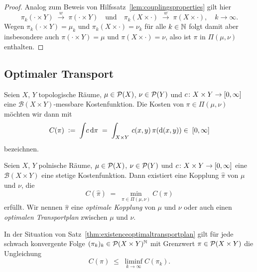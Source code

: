 \documentclass[../main/main.tex]{subfiles}
\begin{document}
	\begin{proof}
		Analog zum Beweis von Hilfssatz~\ref{lem:couplingsproperties} gilt hier
		\[ \pi_k(\cdot \times Y) \; \xrightarrow{w} \; \pi(\cdot \times Y) \quad \text{und} \quad \pi_k(X \times \cdot) \; \xrightarrow{w} \; \pi(X \times \cdot), \quad k \to \infty \text{.} \]
		Wegen $\pi_k(\cdot \times Y) = \mu_k$ und $\pi_k(X \times \cdot) = \nu_k$ für alle $k \in \mathbb{N}$ folgt damit aber insbesondere auch $\pi(\cdot \times Y) = \mu$ und $\pi(X \times \cdot) = \nu$, also
		ist $\pi$ in $\Pi(\mu, \nu)$ enthalten.
	\end{proof}

	\subsection{Optimaler Transport}

	\begin{Definition}
		Seien $X$, $Y$ topologische Räume, $\mu \in \mathcal{P}(X)$, $\nu \in \mathcal{P}(Y)$ und $c \colon X \times Y \to [0, \infty]$ eine $\mathcal{B}(X \times Y)$-messbare Kostenfunktion.
		Die Kosten von $\pi \in \Pi(\mu, \nu)$ möchten wir dann mit
		\[ C(\pi) \; \vcentcolon = \; \int_{} \, c \, \mathrm{d}\pi \; = \; \int_{X \times Y} \, c(x, y) \, \pi(\mathrm{d}(x, y)) \in \; [0, \infty] \]
		bezeichnen.
	\end{Definition}

	\begin{Satz}
		\label{thm:existenceoptimaltransportplan}
		Seien $X$, $Y$ polnische Räume, $\mu \in \mathcal{P}(X)$, $\nu \in \mathcal{P}(Y)$ und $c \colon X \times Y \to [0, \infty]$ eine $\mathcal{B}(X \times Y)$ eine stetige 
		Kostenfunktion. Dann existiert eine Kopplung $\hat{\pi}$ von $\mu$ und $\nu$, die 
		\[ C(\hat{\pi}) \; = \; \min_{\pi \in \Pi(\mu, \nu)} C(\pi) \]
		erfüllt. Wir nennen $\hat{\pi}$ eine \emph{optimale Kopplung} von $\mu$ und $\nu$ oder auch einen \emph{optimalen Transportplan} zwischen $\mu$ und $\nu$.
	\end{Satz}

	\begin{Hilfssatz}
		\label{lem:lsccost}
		In der Situation von Satz~\ref{thm:existenceoptimaltransportplan} gilt für jede schwach konvergente Folge $(\pi_k)_k \in \mathcal{P}(X \times Y)^{\mathbb{N}}$ mit Grenzwert $\pi \in \mathcal{P}(X \times Y)$ die Ungleichung
		\[ C(\pi) \; \leq \; \liminf_{k \to \infty} C(\pi_k) \text{.} \]
	\end{Hilfssatz}
\end{document}
